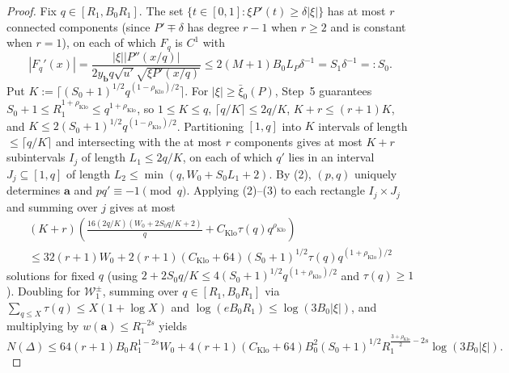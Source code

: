 \documentclass[11pt]{article}
\newcommand{\rhoK}{\rho_{\mathrm{Klo}}}
\newcommand{\CK}{C_{\mathrm{Klo}}}
\begin{document}
\begin{proof}
Fix $q\in[R_1,B_0R_1]$. The set $\{t\in[0,1]:\xi P'(t)\ge\delta|\xi|\}$ has at most $r$ connected components (since $P'\mp\delta$ has degree $r-1$ when $r\ge2$ and is constant when $r=1$), on each of which $F_q$ is $C^1$ with
\[
|F_q'(x)|=\frac{|\xi||P''(x/q)|}{2y_{\mathbf{b}}q\sqrt{u'}\sqrt{\xi P'(x/q)}}\le 2(M+1)B_0L_P\delta^{-1}=S_1\delta^{-1}=:S_0.
\]
Put $K:=\lceil(S_0+1)^{1/2}q^{(1-\rhoK)/2}\rceil$. For $|\xi|\ge\bar\xi_0(P)$, Step~5 guarantees $S_0+1\le R_1^{1+\rhoK}\le q^{1+\rhoK}$, so $1\le K\le q$, $\lceil q/K\rceil\le 2q/K$, $K+r\le(r+1)K$, and $K\le 2(S_0+1)^{1/2}q^{(1-\rhoK)/2}$. Partitioning $[1,q]$ into $K$ intervals of length $\le\lceil q/K\rceil$ and intersecting with the at most $r$ components gives at most $K+r$ subintervals $I_j$ of length $L_1\le 2q/K$, on each of which $q'$ lies in an interval $J_j\subseteq[1,q]$ of length $L_2\le\min(q,W_0+S_0L_1+2)$. By (2), $(p,q)$ uniquely determines $\mathbf{a}$ and $pq'\equiv-1\pmod q$. Applying (2)--(3) to each rectangle $I_j\times J_j$ and summing over $j$ gives at most
\begin{multline*}
(K+r)\!\left(\frac{16(2q/K)(W_0+2S_0q/K+2)}{q}+\CK\tau(q)q^{\rhoK}\right)\\
\le 32(r+1)W_0+2(r+1)(\CK+64)(S_0+1)^{1/2}\tau(q)q^{(1+\rhoK)/2}
\end{multline*}
solutions for fixed $q$ (using $2+2S_0q/K\le 4(S_0+1)^{1/2}q^{(1+\rhoK)/2}$ and $\tau(q)\ge1$). Doubling for $\mathcal{W}_1^\pm$, summing over $q\in[R_1,B_0R_1]$ via $\sum_{q\le X}\tau(q)\le X(1+\log X)$ and $\log(eB_0R_1)\le\log(3B_0|\xi|)$, and multiplying by $w(\mathbf{a})\le R_1^{-2s}$ yields
\[
N(\Delta)\le 64(r+1)B_0R_1^{1-2s}W_0+4(r+1)(\CK+64)B_0^2(S_0+1)^{1/2}R_1^{\frac{3+\rhoK}{2}-2s}\log(3B_0|\xi|).
\]


\end{proof}
\end{document}

